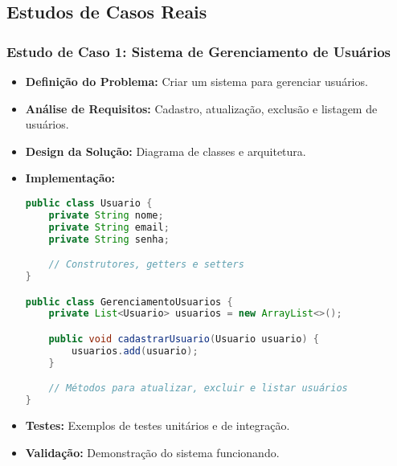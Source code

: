 \documentclass[a4paper,12pt]{book}
\begin{document}
\subsection{Estudos de Casos Reais}
\subsubsection{Estudo de Caso 1: Sistema de Gerenciamento de Usuários}
\begin{itemize}
    \item \textbf{Definição do Problema:} Criar um sistema para gerenciar usuários.
    \item \textbf{Análise de Requisitos:} Cadastro, atualização, exclusão e listagem de usuários.
    \item \textbf{Design da Solução:} Diagrama de classes e arquitetura.
    \item \textbf{Implementação:} 
\begin{lstlisting}[language=Java, caption=Cadastro de Usuário]
public class Usuario {
    private String nome;
    private String email;
    private String senha;

    // Construtores, getters e setters
}

public class GerenciamentoUsuarios {
    private List<Usuario> usuarios = new ArrayList<>();

    public void cadastrarUsuario(Usuario usuario) {
        usuarios.add(usuario);
    }

    // Métodos para atualizar, excluir e listar usuários
}
\end{lstlisting}
    \item \textbf{Testes:} Exemplos de testes unitários e de integração.
    \item \textbf{Validação:} Demonstração do sistema funcionando.
\end{itemize}
\end{document}
